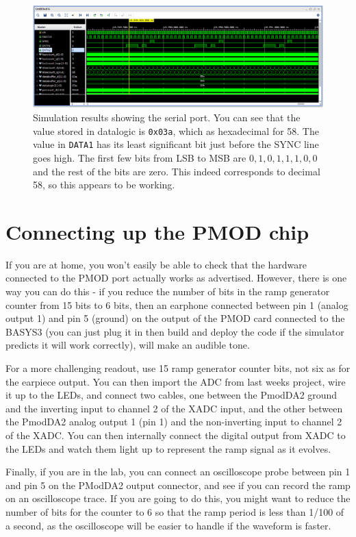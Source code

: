 \documentclass[../physical_computing.tex]{subfiles}
\begin{document}
\begin{figure}[htbp]
    \centering
    \includegraphics[width=1.0\textwidth]{appendix_7/figures/simlong.png}
    \caption{Simulation results showing the serial port. You can see that
    the value stored in datalogic is \texttt{0x03a}, which as
    hexadecimal for 58. The value in \texttt{DATA1} has its least 
    significant bit just before the SYNC line goes high. The first
    few bits from LSB to MSB are $0,1,0,1,1,1,0,0$ and the rest of the
    bits are zero. This indeed corresponds to decimal 58, so this
    appears to be working.}
    \label{fig:simlong}
\end{figure}

\section{Connecting up the PMOD chip}
\label{sec:connections}

If you are at home, you won't easily be able to check that the hardware
connected to the PMOD port actually works as advertised. However, there is
one way you can do this - if you reduce the number of bits in the ramp
generator counter from 15 bits to 6 bits, then an earphone connected between pin 1
(analog output 1) and pin 5 (ground) on the output of the PMOD card connected
to the BASYS3 (you can just plug it in then build and deploy the code
if the simulator predicts it will work correctly), will make an audible tone.

For a more challenging readout, use 15 ramp generator counter bits, not 
six as for the earpiece output. You can then import the ADC from last weeks 
project, wire it up to the LEDs, and connect two cables, one between 
the PmodDA2 ground and the inverting input to channel 2 of the XADC 
input, and the other between the PmodDA2 analog output 1 (pin 1) and the
non-inverting input to channel 2 of the XADC. You can then internally 
connect the digital output from XADC to the LEDs and watch them light 
up to represent the ramp signal as it evolves.

Finally, if you are in the lab, you can connect an oscilloscope probe between
pin 1 and pin 5 on the PModDA2 output connector, and see if you can record the 
ramp on an oscilloscope trace. If you are going to do this, you might want to
reduce the number of bits for the counter to 6 so that the ramp period is 
less than 1/100 of a second, as the oscilloscope will be easier to handle
if the waveform is faster.
\end{document}
